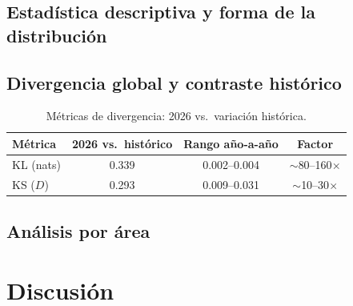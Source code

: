 \documentclass[11pt,a4paper]{article}
\begin{document}
\subsection{Estadística descriptiva y forma de la distribución}


\subsection{Divergencia global y contraste histórico}
\begin{table}[ht]
    \centering
    \caption{Métricas de divergencia: 2026 vs.\ variación histórica.}
    \begin{tabular}{lccc}
        \toprule
        Métrica & 2026 vs.\ histórico & Rango año-a-año & Factor \\
        \midrule
        KL (nats)      & 0.339 & 0.002--0.004 & $\sim$80--160$\times$ \\
        KS ($D$)       & 0.293 & 0.009--0.031 & $\sim$10--30$\times$ \\
        \bottomrule
    \end{tabular}
    \label{tab:global}
\end{table}

\subsection{Análisis por área}

\section{Discusión}
\end{document}
